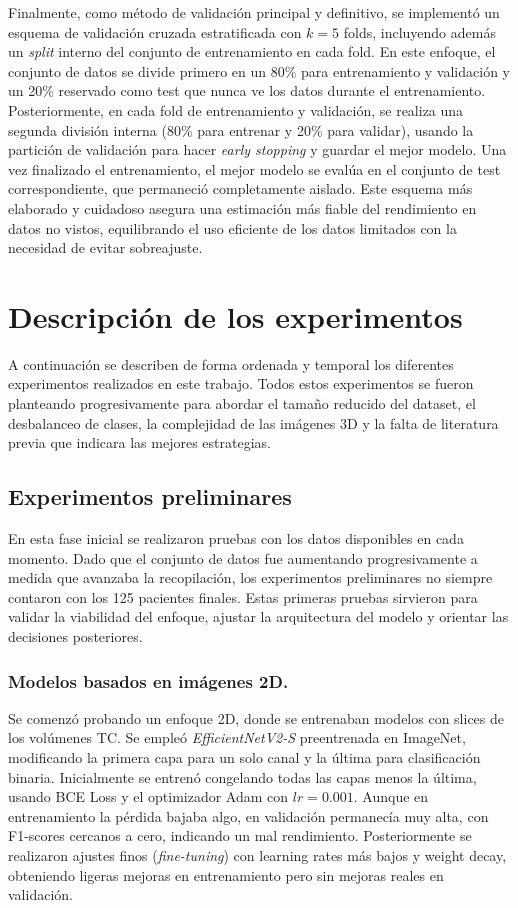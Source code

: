 Finalmente, como método de validación principal y definitivo, se implementó un esquema de validación cruzada estratificada con \(k=5\) folds, incluyendo además un \emph{split} interno del conjunto de entrenamiento en cada fold. En este enfoque, el conjunto de datos se divide primero en un 80\% para entrenamiento y validación y un 20\% reservado como test que nunca ve los datos durante el entrenamiento. Posteriormente, en cada fold de entrenamiento y validación, se realiza una segunda división interna (80\% para entrenar y 20\% para validar), usando la partición de validación para hacer \emph{early stopping} y guardar el mejor modelo. Una vez finalizado el entrenamiento, el mejor modelo se evalúa en el conjunto de test correspondiente, que permaneció completamente aislado. Este esquema más elaborado y cuidadoso asegura una estimación más fiable del rendimiento en datos no vistos, equilibrando el uso eficiente de los datos limitados con la necesidad de evitar sobreajuste.




\section{Descripción de los experimentos} \label{sec:experimentos}

A continuación se describen de forma ordenada y temporal los diferentes experimentos realizados en este trabajo. Todos estos experimentos se fueron planteando progresivamente para abordar el tamaño reducido del dataset, el desbalanceo de clases, la complejidad de las imágenes 3D y la falta de literatura previa que indicara las mejores estrategias. 


\subsection{Experimentos preliminares}
En esta fase inicial se realizaron pruebas con los datos disponibles en cada momento. Dado que el conjunto de datos fue aumentando progresivamente a medida que avanzaba la recopilación, los experimentos preliminares no siempre contaron con los 125 pacientes finales. Estas primeras pruebas sirvieron para validar la viabilidad del enfoque, ajustar la arquitectura del modelo y orientar las decisiones posteriores.


\subsubsection{Modelos basados en imágenes 2D.} 
Se comenzó probando un enfoque 2D, donde se entrenaban modelos con slices de los volúmenes TC. Se empleó \textit{EfficientNetV2-S} preentrenada en ImageNet, modificando la primera capa para un solo canal y la última para clasificación binaria. Inicialmente se entrenó congelando todas las capas menos la última, usando BCE Loss y el optimizador Adam con $lr=0.001$. Aunque en entrenamiento la pérdida bajaba algo, en validación permanecía muy alta, con F1-scores cercanos a cero, indicando un mal rendimiento. Posteriormente se realizaron ajustes finos (\emph{fine-tuning}) con learning rates más bajos y weight decay, obteniendo ligeras mejoras en entrenamiento pero sin mejoras reales en validación.

